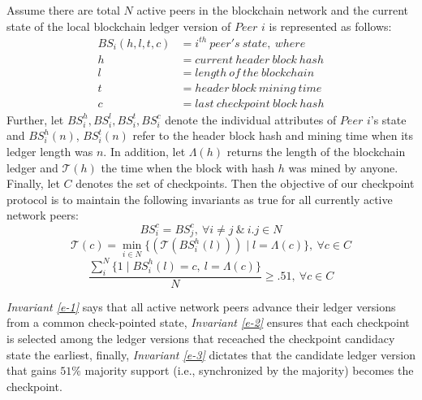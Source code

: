 Assume there are total $N$ active peers in the blockchain network and the current state of the local blockchain ledger version of $Peer$ $i$ is represented as follows:
\begin{equation*}
\begin{split}
	BS_i(h, l, t, c) & = i^{th}\ peer's\ state,\ where \\
	h & = current\ header\ block\ hash \\
	l & = length\ of\ the\ blockchain \\
	t & = header\ block\ mining\ time \\
	c & = last\ checkpoint\ block\ hash	 
\end{split}
\end{equation*}
Further, let $BS_i^h, BS_i^l, BS_i^t, BS_i^c$ denote the individual attributes of $Peer$ $i$'s state and $BS_i^h(n)$, $BS_i^t(n)$ refer to the header block hash and mining time when its ledger length was $n$. In addition, let $\Lambda(h)$ returns the length of the blockchain ledger and $\mathcal{T}(h)$ the time when the block with hash $h$ was mined by anyone. Finally, let $C$ denotes the set of checkpoints. Then the objective of our checkpoint protocol is to maintain the following invariants as true for all currently active network peers:
\begin{equation}
\label{e-1}
BS_i^c = BS_j^c,\ \forall i \neq j\ \&\ i.j \in N
\end{equation}
\begin{equation}
\label{e-2}
\mathcal{T}(c) = \min_{i \in N}\{(\mathcal{T}(BS_i^h(l))) \mid l = \Lambda(c)\},\ \forall c \in C  
\end{equation}
\begin{equation}
\label{e-3}
\frac{\sum_i^N{\{1 \mid BS_i^h(l) = c,\ l = \Lambda(c)}\}}{N} \geq .51,\ \forall c \in C  
\end{equation}

\textit{Invariant \ref{e-1}} says that all active network peers advance their ledger versions from a common check-pointed state, \textit{Invariant \ref{e-2}} ensures that each checkpoint is selected among the ledger versions that receached the checkpoint candidacy state the earliest, finally, \textit{Invariant \ref{e-3}} dictates that the candidate ledger version that gains $51\%$ majority support (i.e., synchronized by the majority) becomes the checkpoint.

